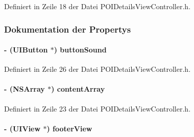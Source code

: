 Definiert in Zeile 18 der Datei POIDetailsViewController.h.

\subsubsection{Dokumentation der Propertys}
\hypertarget{interface_p_o_i_details_view_controller_a35c04f7920916d5236c5d076580600a8}{
\paragraph[{buttonSound}]{\setlength{\rightskip}{0pt plus 5cm}-\/ (UIButton $\ast$) buttonSound}\hfill}
\label{interface_p_o_i_details_view_controller_a35c04f7920916d5236c5d076580600a8}


Definiert in Zeile 26 der Datei POIDetailsViewController.h.\hypertarget{interface_p_o_i_details_view_controller_a7652ae673a08d785ae1699559b39344b}{
\paragraph[{contentArray}]{\setlength{\rightskip}{0pt plus 5cm}-\/ (NSArray $\ast$) contentArray}\hfill}
\label{interface_p_o_i_details_view_controller_a7652ae673a08d785ae1699559b39344b}


Definiert in Zeile 23 der Datei POIDetailsViewController.h.\hypertarget{interface_p_o_i_details_view_controller_a5b670e066edf54f1f94ff6c521aafad1}{
\paragraph[{footerView}]{\setlength{\rightskip}{0pt plus 5cm}-\/ (UIView $\ast$) footerView}\hfill}
\label{interface_p_o_i_details_view_controller_a5b670e066edf54f1f94ff6c521aafad1}



